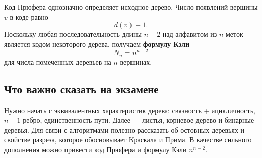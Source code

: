 Код Прюфера однозначно определяет исходное дерево. Число появлений вершины $v$ в
коде равно
\[
    d(v)-1.
\]
Поскольку любая последовательность длины $n-2$ над алфавитом из $n$ меток
является кодом некоторого дерева, получаем \textbf{формулу Кэли}
\[
    N_n=n^{n-2}
\]
для числа помеченных деревьев на $n$ вершинах.

\subsection{Что важно сказать на экзамене}

Нужно начать с эквивалентных характеристик дерева: связность + ацикличность,
$n-1$ ребро, единственность пути. Далее --- листья, корневое дерево и бинарные
деревья. Для связи с алгоритмами полезно рассказать об остовных деревьях и
свойстве разреза, которое обосновывает Краскала и Прима. В качестве сильного
дополнения можно привести код Прюфера и формулу Кэли $n^{n-2}$.

\newpage
